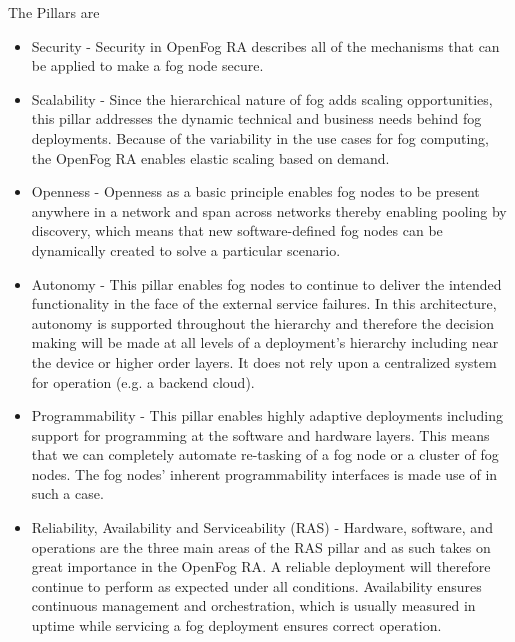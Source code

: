 \documentclass{article}
\begin{document}
The Pillars\cite{openfogconsortium2017} are 
\begin{itemize}
\item Security - Security in OpenFog RA describes all of the mechanisms that can be applied to make a fog node secure. 

\item Scalability - Since the hierarchical nature of fog adds scaling opportunities, this pillar addresses the dynamic technical and business needs behind fog deployments. Because of the variability in the use cases for fog computing, the OpenFog RA enables elastic scaling based on demand\cite{openfogconsortium2017}.

\item Openness - Openness as a basic principle enables fog nodes to be present anywhere in a network and span across networks thereby enabling pooling by discovery, which means that new software-defined fog nodes can be dynamically created to solve a particular scenario\cite{openfogconsortium2017}.

\item Autonomy - This pillar enables fog nodes to continue to deliver the intended functionality in the face of the external service failures. In this architecture, autonomy is supported throughout the hierarchy and therefore the decision making will be made at all levels of a deployment’s hierarchy including near the device or higher order layers. It does not rely upon a centralized system for operation (e.g. a backend cloud)\cite{openfogconsortium2017}.

\item Programmability - This pillar enables highly adaptive deployments including support for programming at the software and hardware layers. This means that we can completely automate re-tasking of a fog node or a cluster of fog nodes\cite{openfogconsortium2017}. The fog nodes' inherent programmability interfaces is made use of in such a case.

\item Reliability, Availability and Serviceability (RAS) - Hardware, software, and operations are the three main areas of the RAS pillar and as such takes on great importance in the OpenFog RA\cite{openfogconsortium2017}. 
A reliable deployment will therefore continue to perform as expected under all conditions. Availability ensures continuous management and orchestration, which is usually measured in uptime while servicing a fog deployment ensures correct operation.


\end{itemize}
\end{document}
